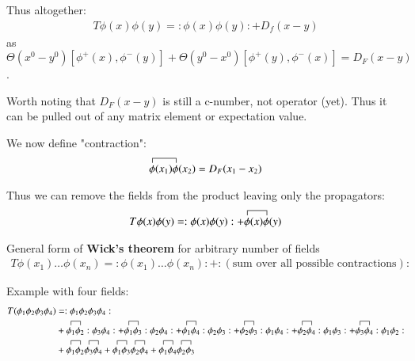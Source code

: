 Thus altogether: 
\begin{align}
	T\phi(x)\phi(y) = :\phi(x)\phi(y): + D_f(x-y)
\end{align}
as $\Theta(x^0 - y^0) [\phi^+(x), \phi^-(y)] + \Theta(y^0 - x^0) [\phi^+(y), \phi^-(x)] = D_F(x-y)$.

Worth noting that $D_F(x-y)$ is still a c-number, not operator (yet). Thus it can be pulled out of any matrix element or expectation value.

We now define "contraction":
\begin{align}
	\contraction[1ex]{}{\phi}{(x_1)}{\phi}	\phi(x_1) \phi(x_2) = D_F(x_1-x_2)
\end{align}

Thus we can remove the fields from the product leaving only the propagators:
\begin{align}
	T\phi(x)\phi(y) = :\phi(x)\phi(y): +  \contraction[1ex]{}{\phi}{(x)}{\phi}	\phi(x) \phi(y)
\end{align}

General form of \textbf{Wick's theorem} for arbitrary number of fields
\begin{align}
	T\phi(x_1)\dots \phi(x_n) = :\phi(x_1)\dots \phi(x_n):	 + :\left( \text{sum over all possible contractions} \right):
\end{align}

Example with four fields:
\begin{align*}
	T(\phi_1 \phi_2 \phi_3 \phi_4) &= :\phi_1 \phi_2 \phi_3 \phi_4: \\
								   & + \contraction{}{\phi_1}{}{\phi_2} \phi_1 \phi_2 :\phi_3 \phi_4: + \contraction{}{\phi_1}{}{\phi_3} \phi_1 \phi_3 :\phi_2 \phi_4: + \contraction{}{\phi_1}{}{\phi_4} \phi_1 \phi_4 :\phi_2 \phi_3: +  \contraction{}{\phi_2}{}{\phi_3} \phi_2 \phi_3 :\phi_1 \phi_4: + \contraction{}{\phi_2}{}{\phi_4} \phi_2 \phi_4 :\phi_1 \phi_3: + \contraction{}{\phi_3}{}{\phi_4} \phi_3 \phi_4 :\phi_1 \phi_2: \\
	&+ \contraction{}{\phi_1}{}{\phi_2} \phi_1 \phi_2 \contraction{}{\phi_3}{}{\phi_4}\phi_3 \phi_4 + \contraction{}{\phi_1}{}{\phi_3} \phi_1 \phi_3 \contraction{}{\phi_2}{}{\phi_4}\phi_2 \phi_4 + \contraction{}{\phi_1}{}{\phi_4} \phi_1 \phi_4 \contraction{}{\phi_2}{}{\phi_3}\phi_2 \phi_3
\end{align*}


